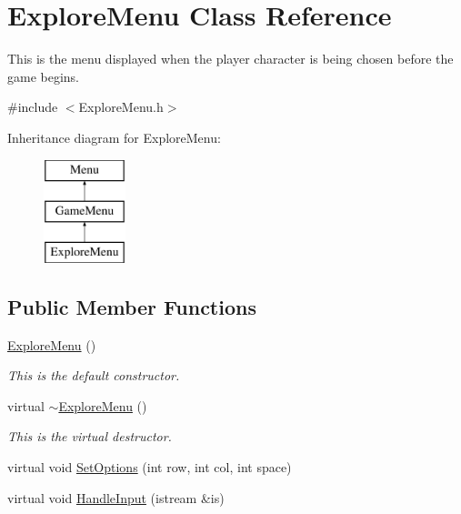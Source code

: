 \hypertarget{classExploreMenu}{\section{Explore\-Menu Class Reference}
\label{classExploreMenu}
}


This is the menu displayed when the player character is being chosen before the game begins.  




{\ttfamily \#include $<$Explore\-Menu.\-h$>$}

Inheritance diagram for Explore\-Menu\-:\begin{figure}[H]
\begin{center}
\leavevmode
\includegraphics[height=3.000000cm]{classExploreMenu}
\end{center}
\end{figure}
\subsection*{Public Member Functions}
\begin{DoxyCompactItemize}
\item 
\hyperlink{classExploreMenu_ac05a4f8e2972f1617a702e04677f241b}{Explore\-Menu} ()
\begin{DoxyCompactList}\small\item\em This is the default constructor. \end{DoxyCompactList}\item 
virtual \hyperlink{classExploreMenu_ade9d89c5b19679f01b73120120022e68}{$\sim$\-Explore\-Menu} ()
\begin{DoxyCompactList}\small\item\em This is the virtual destructor. \end{DoxyCompactList}\item 
virtual void \hyperlink{classExploreMenu_a01fdbb56ef495290e825ec9a57ecd2b6}{Set\-Options} (int row, int col, int space)
\item 
virtual void \hyperlink{classExploreMenu_aa75a9fcba679d683855d3188f1fc3505}{Handle\-Input} (istream \&is)
\end{DoxyCompactItemize}
